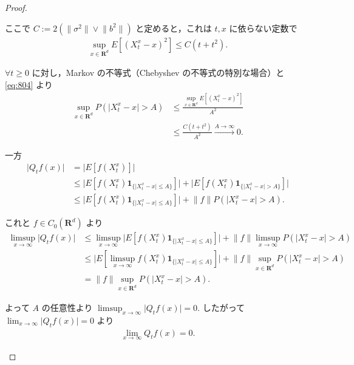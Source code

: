 \documentclass{jsarticle}
\begin{document}
\begin{proof}
\begin{enumerate}[label=(\arabic*)]
\begin{enumerate}[label=(\roman*)]
            ここで $C:=2(\lVert \sigma^2\rVert\vee\lVert b^2\rVert)$ と定めると，これは $t, x$ に依らない定数で
            \setcounter{equation}{3}
            \begin{align}
                \sup_{x\in\mathbf{R}^d}E[(X_{t}^{x}-x)^2]
                \le C(t+t^2).
                \label{eq:804}
            \end{align}

            $\forall t\ge0$ に対し，Markov の不等式（Chebyshev の不等式の特別な場合）と \eqref{eq:804} より
            \begin{align}
                \sup_{x\in\mathbf{R}^d}P(\lvert X_{t}^{x}-x\rvert>A)
                &\le \frac{\sup_{x\in\mathbf{R}^d}E[(X_{t}^{x}-x)^2]}{A^2} \\
                &\le \frac{C(t+t^2)}{A^2}\xrightarrow{A\to\infty}0.
            \end{align}

            一方
            \begin{align}
                \lvert Q_{t}f(x)\rvert
                &= \lvert E[f(X_{t}^{x})]\rvert \\
                &\le \lvert E[f(X_{t}^{x})\bm{1}_{\{\lvert X_{t}^{x}-x\rvert\le A\}}]\rvert
                + \lvert E[f(X_{t}^{x})\bm{1}_{\{\lvert X_{t}^{x}-x\rvert>A\}}]\rvert \\
                &\le \lvert E[f(X_{t}^{x})\bm{1}_{\{\lvert X_{t}^{x}-x\rvert\le A\}}]\rvert
                + \lVert f\rVert P(\lvert X_{t}^{x}-x\rvert>A).
            \end{align}

            これと $f\in C_{0}(\mathbf{R}^d)$ より
            \begin{align}
                \limsup_{x\to\infty}\lvert Q_{t}f(x)\rvert
                &\le \limsup_{x\to\infty}\lvert E[f(X_{t}^{x})\bm{1}_{\{\lvert X_{t}^{x}-x\rvert\le A\}}]\rvert
                + \lVert f\rVert \limsup_{x\to\infty}P(\lvert X_{t}^{x}-x\rvert>A) \\
                &\le \lvert E[\limsup_{x\to\infty}f(X_{t}^{x})\bm{1}_{\{\lvert X_{t}^{x}-x\rvert\le A\}}]\rvert
                + \lVert f\rVert \sup_{x\in\mathbf{R}^d}P(\lvert X_{t}^{x}-x\rvert>A) \\
                &= \lVert f\rVert \sup_{x\in\mathbf{R}^d}P(\lvert X_{t}^{x}-x\rvert>A).
            \end{align}

            よって $A$ の任意性より $\limsup_{x\to\infty}\lvert Q_{t}f(x)\rvert=0.$
            したがって $\lim_{x\to\infty}\lvert Q_{t}f(x)\rvert=0$ より 
            \begin{align}
                \lim_{x\to\infty}Q_{t}f(x)=0.
            \end{align}
            

\end{enumerate}
\end{enumerate}
\end{proof}
\end{document}
